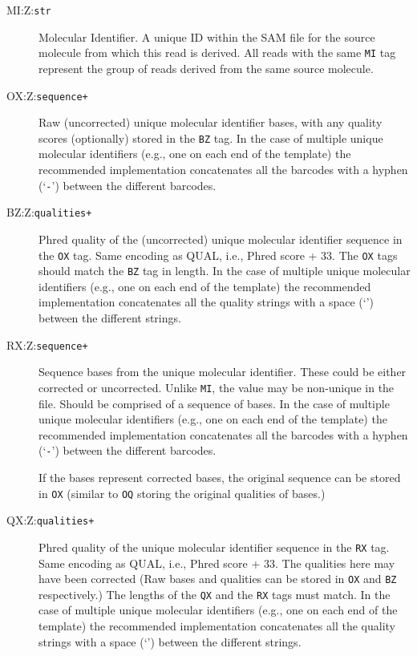 \documentclass[10pt]{article}
\newcommand{\tagvalue}[1]{{\tt #1}}
\begin{document}
\begin{description}
\item[MI:Z:\tagvalue{str}]
Molecular Identifier. 
A unique ID within the SAM file for the source molecule from which this read is derived. 
All reads with the same {\tt MI} tag represent the group of reads derived from the same source molecule. 

\item[OX:Z:\tagvalue{sequence+}] 
Raw (uncorrected) unique molecular identifier bases, with any quality scores (optionally) stored in the {\tt BZ} tag. 
In the case of multiple unique molecular identifiers (e.g., one on each end of the template) the recommended implementation concatenates all the barcodes with a hyphen (`{\tt -}') between the different barcodes.

\item[BZ:Z:\tagvalue{qualities+}] 
Phred quality of the (uncorrected) unique molecular identifier sequence in the {\tt OX} tag.
Same encoding as {\sf QUAL}, i.e., Phred score + 33.
The {\tt OX} tags should match the {\tt BZ} tag in length. 
In the case of multiple unique molecular identifiers (e.g., one on each end of the template) the recommended implementation concatenates all the quality strings with a space (`{\tt \textvisiblespace}') between the different strings.

\item[RX:Z:\tagvalue{sequence+}]
Sequence bases from the unique molecular identifier.
These could be either corrected or uncorrected. Unlike {\tt MI}, the value may be non-unique in the file.
Should be comprised of a sequence of bases.
In the case of multiple unique molecular identifiers (e.g., one on each end of the template) the recommended implementation concatenates all the barcodes with a hyphen (`{\tt -}') between the different barcodes.

If the bases represent corrected bases, the original sequence can be stored in {\tt OX} (similar to {\tt OQ} storing the original qualities of bases.)

\item[QX:Z:\tagvalue{qualities+}]
Phred quality of the unique molecular identifier sequence in the {\tt RX} tag.
Same encoding as {\sf QUAL}, i.e., Phred score + 33.
The qualities here may have been corrected (Raw bases and qualities can be stored in {\tt OX} and {\tt BZ} respectively.)
The lengths of the {\tt QX} and the {\tt RX} tags must match.
In the case of multiple unique molecular identifiers (e.g., one on each end of the template) the recommended implementation concatenates all the quality strings with a space (`{\tt \textvisiblespace}') between the different strings.
\end{description}
\end{document}
